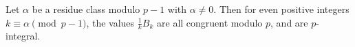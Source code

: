 Let $\alpha$ be a residue class modulo $p-1$ with $\alpha \neq 0$. Then for even positive integers $k \equiv \alpha \pmod{p-1}$, the values $\frac{1}{k}B_k$ are all congruent modulo $p$, and are $p$-integral.
